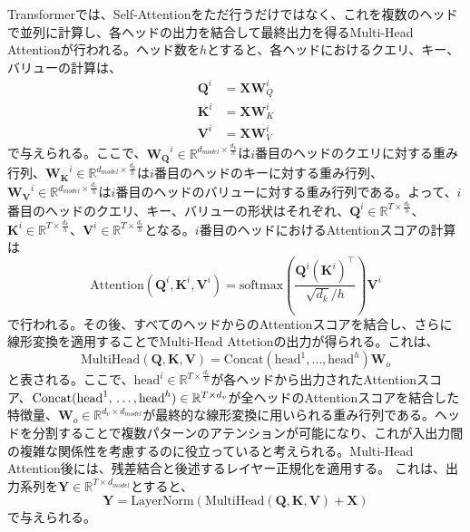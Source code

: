 \documentclass[12pt]{jarticle}
\numberwithin{equation}{section}    %
\numberwithin{figure}{section}      %
\numberwithin{table}{section}      %
\begin{document}
Transformerでは、Self-Attentionをただ行うだけではなく、これを複数のヘッドで並列に計算し、各ヘッドの出力を結合して最終出力を得るMulti-Head Attentionが行われる。ヘッド数を$h$とすると、各ヘッドにおけるクエリ、キー、バリューの計算は、
\begin{align}
    \bm{Q}^{i} & = \bm{X}\bm{W}_{Q}^{i} \\
    \bm{K}^{i} & = \bm{X}\bm{W}_{K}^{i} \\
    \bm{V}^{i} & = \bm{X}\bm{W}_{V}^{i}
\end{align}
で与えられる。ここで、$\bm{W_{Q}}^{i} \in \mathbb{R}^{d_{model} \times \frac{d_{k}}{h}}$は$i$番目のヘッドのクエリに対する重み行列、$\bm{W_{K}}^{i} \in \mathbb{R}^{d_{model} \times \frac{d_{k}}{h}}$は$i$番目のヘッドのキーに対する重み行列、$\bm{W_{V}}^{i} \in \mathbb{R}^{d_{model} \times \frac{d_{v}}{h}}$は$i$番目のヘッドのバリューに対する重み行列である。よって、$i$番目のヘッドのクエリ、キー、バリューの形状はそれぞれ、$\bm{Q}^{i} \in \mathbb{R}^{T \times \frac{d_{k}}{h}}$、$\bm{K}^{i} \in \mathbb{R}^{T \times \frac{d_{k}}{h}}$、$\bm{V}^{i} \in \mathbb{R}^{T \times \frac{d_{v}}{h}}$となる。$i$番目のヘッドにおけるAttentionスコアの計算は
\begin{equation}
    \text{Attention}(\bm{Q}^{i}, \bm{K}^{i}, \bm{V}^{i}) = \text{softmax}\left(\frac{\bm{Q}^{i}(\bm{K}^{i})^\top}{\sqrt{d_{k}} / h}\right) \bm{V}^{i}
\end{equation}
で行われる。その後、すべてのヘッドからのAttentionスコアを結合し、さらに線形変換を適用することでMulti-Head Attetionの出力が得られる。これは、
\begin{equation}
    \text{MultiHead}(\bm{Q}, \bm{K}, \bm{V}) = \text{Concat}(\text{head}^{1}, \ldots, \text{head}^{h})\bm{W}_{o}
\end{equation}
と表される。ここで、$\text{head}^{i} \in \mathbb{R}^{T \times \frac{d_{v}}{h}}$が各ヘッドから出力されたAttentionスコア、$\text{Concat}(\text{head}^{1}, \\ \ldots, \text{head}^{h}) \in \mathbb{R}^{T \times d_{v}}$が全ヘッドのAttentionスコアを結合した特徴量、$\bm{W}_{o} \in \mathbb{R}^{d_{v} \times d_{model}}$が最終的な線形変換に用いられる重み行列である。ヘッドを分割することで複数パターンのアテンションが可能になり、これが入出力間の複雑な関係性を考慮するのに役立っていると考えられる。Multi-Head Attention後には、残差結合と後述するレイヤー正規化を適用する。
これは、出力系列を$\bm{Y} \in \mathbb{R}^{T \times d_{model}}$とすると、
\begin{equation}
    \bm{Y} = \text{LayerNorm}\left(\text{MultiHead}(\bm{Q}, \bm{K}, \bm{V}) + \bm{X}\right)
\end{equation}
で与えられる。
\end{document}
